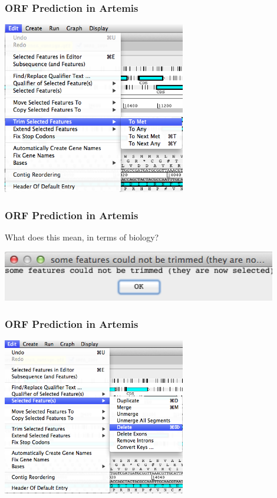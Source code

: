 \documentclass[table]{beamer}
\begin{document}
    \begin{frame}
      \frametitle{ORF Prediction in Artemis}    
      \begin{center}
        \includegraphics[width=0.6\textwidth]{images/artemis_orf8}     
      \end{center}
    \end{frame} 

    \begin{frame}
      \frametitle{ORF Prediction in Artemis}
      What does this mean, in terms of biology?
      \begin{center}
        \includegraphics[width=0.9\textwidth]{images/artemis_orf9}     
      \end{center}
    \end{frame} 

    \begin{frame}
      \frametitle{ORF Prediction in Artemis}    
      \begin{center}
        \includegraphics[width=0.6\textwidth]{images/artemis_orf10}     
      \end{center}
    \end{frame} 
\end{document}

